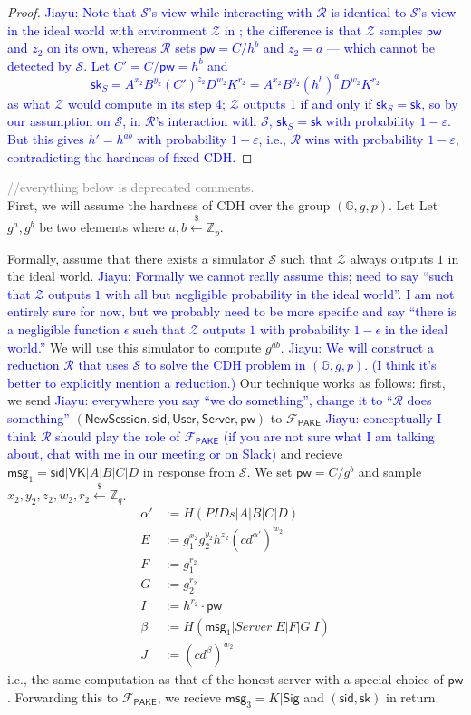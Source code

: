 \documentclass[12pt,a4paper]{article}
\newcommand{\simulator}{\mathcal{S}}
\newcommand{\env}{\mathcal{Z}}
\newcommand{\pake}{\mathcal{F}_{\mathsf{PAKE}}}
\newcommand{\user}{\mathsf{User}}
\newcommand{\sk}{\mathsf{sk}}
\newcommand{\pw}{\mathsf{pw}}
\newcommand{\newsession}{\mathsf{NewSession}}
\newcommand{\server}{\mathsf{Server}}
\newcommand{\msg}[1]{\mathsf{msg}_{#1}}
\def\xjy#1{\textcolor{blue}{Jiayu: #1}}
\begin{document}
\begin{proof}
\xjy{Note that $\simulator$'s view while interacting with $\mathcal{R}$ is identical to $\simulator$'s view in the ideal world with environment $\env$ in \Cref{fig:adv}; the difference is that $\env$ samples $\pw$ and $z_2$ on its own, whereas $\mathcal{R}$ sets $\pw = C/h^b$ and $z_2 = a$ --- which cannot be detected by $\simulator$. Let $C' = C/\pw = h^b$ and
$$\sk_S = A^{x_2}B^{y_2}(C')^{z_2}D^{w_2}K^{r_2}=A^{x_2}B^{y_2}(h^b)^{a}D^{w_2}K^{r_2}$$
as what $\env$ would compute in its step 4; $\env$ outputs 1 if and only if $\sk_S = \sk$, so by our assumption on $\simulator$, in $\mathcal{R}$'s interaction with $\simulator$, $\sk_S = \sk$ with probability $1-\varepsilon$. But this gives $h' = h^{ab}$ with probability $1-\varepsilon$, i.e., $\mathcal{R}$ wins with probability $1-\varepsilon$, contradicting the hardness of fixed-CDH.}
		\end{proof}
	
	
	\textcolor{gray}{//everything below is deprecated comments.}\\

	
	First, we will assume the hardness of CDH over the group $(\mathbb{G},g,p)$. Let Let $g^a,g^b$ be two elements where $a,b\xleftarrow{\$}\mathbb{Z}_p$. 
	
	Formally, assume that there exists a simulator $\simulator$ such that $\env$ always outputs $1$ in the ideal world. \xjy{Formally we cannot really assume this; need to say ``such that $\env$ outputs $1$ with all but negligible probability in the ideal world''. I am not entirely sure for now, but we probably need to be more specific and say ``there is a negligible function $\epsilon$ such that $\env$ outputs $1$ with probability $1-\epsilon$ in the ideal world.''} We will use this simulator to compute $g^{ab}$. \xjy{We will construct a reduction $\mathcal{R}$ that uses $\simulator$ to solve the CDH problem in $(\mathbb{G},g,p)$. (I think it's better to explicitly mention a reduction.)} Our technique works as follows: first, we send \xjy{everywhere you say ``we do something'', change it to ``$\mathcal{R}$ does something''} $(\newsession,\mathsf{sid},\user,\server,\pw)$ to $\pake$ \xjy{conceptually I think $\mathcal{R}$ should play the role of $\pake$ (if you are not sure what I am talking about, chat with me in our meeting or on Slack)} and recieve $\msg{1} = \mathsf{sid}|\mathsf{VK}|A|B|C|D$ in response from $\simulator$. We set $\pw = C/g^b$ and sample $x_2,y_2,z_2,w_2,r_2\xleftarrow{\$}\mathbb{Z}_q$. 
	\begin{align*}
		\alpha'&:=H(PIDs|A|B|C|D)\\
		E &:= g_1^{x_2}g_2^{y_2}h^{z_2}(cd^{\alpha'})^{w_2}\\
		F &:= g_1^{r_2}\\
		G &:= g_2^{r_2}\\
		I &:= h^{r_2}\cdot\pw\\
		\beta &:= H(\msg{1}|Server|E|F|G|I)\\
		J &:= (cd^{\beta})^{w_2}
	\end{align*}
	i.e., the same computation as that of the honest server with a special choice of $\pw$. Forwarding this to $\pake$, we recieve $\msg{3}=K|\mathsf{Sig}$ and $(\mathsf{sid}, \sk)$ in return.

	
	
	
	\pagebreak
	\appendix
	
%	
%	
	
\end{document}
